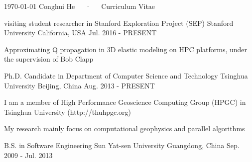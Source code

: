 \documentclass[11pt, a4paper]{awesome-cv}
\begin{document}
\makecvheader

\makecvfooter
  {\today}
  {Conghui He~~~·~~~Curriculum Vitae}
  {\thepage}




\begin{cventries}

  \cventry
    {visiting student researcher in Stanford Exploration Project (SEP)} %
    {Stanford University} %
    {California, USA} %
    {Jul. 2016 - PRESENT} %
    {
      \begin{cvitems} %
        \item {Approximating Q propagation in 3D elastic modeling on HPC platforms, under the supervision of Bob Clapp}
      \end{cvitems}
    }

  \cventry
    {Ph.D. Candidate in Department of Computer Science and Technology} %
    {Tsinghua University} %
    {Beijing, China} %
    {Aug. 2013 - PRESENT} %
    {
      \begin{cvitems} %
        \item {I am a member of High Performance Geoscience Computing Group (HPGC) in Tsinghua University (http://thuhpgc.org)}
        \item {My research mainly focus on computational geophysics and parallel algorithms}
      \end{cvitems}
    }

  \cventry
    {B.S. in Software Engineering} %
    {Sun Yat-sen University} %
    {Guangdong, China} %
    {Sep. 2009 - Jul. 2013} %
    {}
\end{cventries}
\end{document}

